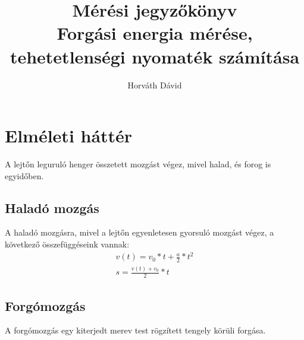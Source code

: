 \documentclass[twoside]{article}
\title{Mérési jegyzőkönyv\\
\large Forgási energia mérése, tehetetlenségi nyomaték számítása}
\author{Horváth Dávid}
\begin{document}
\pagestyle{fancy}
\maketitle
\tableofcontents
\pagebreak
\section{Elméleti háttér}
	A lejtőn leguruló henger összetett mozgást végez, mivel halad, és forog is egyidőben. 
	\subsection{Haladó mozgás}
	A haladó mozgásra, mivel a lejtőn egyenletesen gyorsuló mozgást végez, a következő összefüggéseink vannak:
	\begin{gather}
		v(t)=v_0*t+\frac{a}{2}*t^2\label{eq:1}\\
		s=\frac{v(t)+v_0}{2}*t\label{eq:2}
	\end{gather}
	\subsection{Forgómozgás}
		A forgómozgás egy kiterjedt merev test rögzített tengely körüli forgása. 
\end{document}
